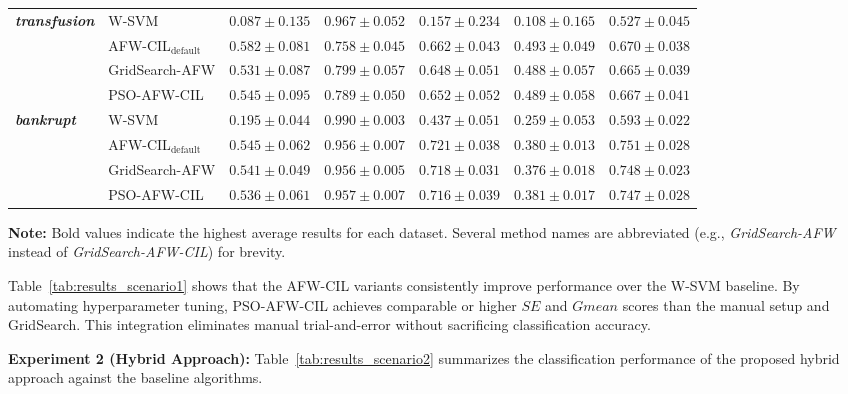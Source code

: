 \documentclass[pdflatex,sn-mathphys-num]{sn-jnl}%
\theoremstyle{thmstyleone}%
\theoremstyle{thmstyletwo}
\theoremstyle{thmstylethree}
\begin{document}
\begin{table}[htbp]
{\begin{tabular}{llccccc}
\midrule
\multirow{4}{*}{\textbf{\textit{transfusion}}}
& W-SVM & $0.087 \pm 0.135$ & $\mathbf{0.967 \pm 0.052}$ & $0.157 \pm 0.234$ & $0.108 \pm 0.165$ & $0.527 \pm 0.045$ \\
& AFW-CIL$_{\mathrm{default}}$ & $\mathbf{0.582 \pm 0.081}$ & $0.758 \pm 0.045$ & $\mathbf{0.662 \pm 0.043}$ & $\mathbf{0.493 \pm 0.049}$ & $\mathbf{0.670 \pm 0.038}$ \\
& GridSearch-AFW & $0.531 \pm 0.087$ & $0.799 \pm 0.057$ & $0.648 \pm 0.051$ & $0.488 \pm 0.057$ & $0.665 \pm 0.039$ \\
& PSO-AFW-CIL & $0.545 \pm 0.095$ & $0.789 \pm 0.050$ & $0.652 \pm 0.052$ & $0.489 \pm 0.058$ & $0.667 \pm 0.041$ \\
\midrule
\multirow{4}{*}{\textbf{\textit{bankrupt}}}
& W-SVM & $0.195 \pm 0.044$ & $\mathbf{0.990 \pm 0.003}$ & $0.437 \pm 0.051$ & $0.259 \pm 0.053$ & $0.593 \pm 0.022$ \\
& AFW-CIL$_{\mathrm{default}}$ & $\mathbf{0.545 \pm 0.062}$ & $0.956 \pm 0.007$ & $\mathbf{0.721 \pm 0.038}$ & $0.380 \pm 0.013$ & $\mathbf{0.751 \pm 0.028}$ \\
& GridSearch-AFW & $0.541 \pm 0.049$ & $0.956 \pm 0.005$ & $0.718 \pm 0.031$ & $0.376 \pm 0.018$ & $0.748 \pm 0.023$ \\
& PSO-AFW-CIL & $0.536 \pm 0.061$ & $0.957 \pm 0.007$ & $0.716 \pm 0.039$ & $\mathbf{0.381 \pm 0.017}$ & $0.747 \pm 0.028$ \\
\bottomrule
\end{tabular}
}

\smallskip
\noindent \footnotesize \textbf{Note:} Bold values indicate the highest average results for each dataset. Several method names are abbreviated (e.g., \textit{GridSearch-AFW} instead of \textit{GridSearch-AFW-CIL}) for brevity.
\end{table}

\smallskip
Table~\ref{tab:results_scenario1} shows that the AFW-CIL variants consistently improve performance over the W-SVM baseline. By automating hyperparameter tuning, PSO-AFW-CIL achieves comparable or higher $SE$ and $Gmean$ scores than the manual setup and GridSearch. This integration eliminates manual trial-and-error without sacrificing classification accuracy.


\smallskip
\noindent \textbf{Experiment 2 (Hybrid Approach):} Table~\ref{tab:results_scenario2} summarizes the classification performance of the proposed hybrid approach against the baseline algorithms.
\end{document}
